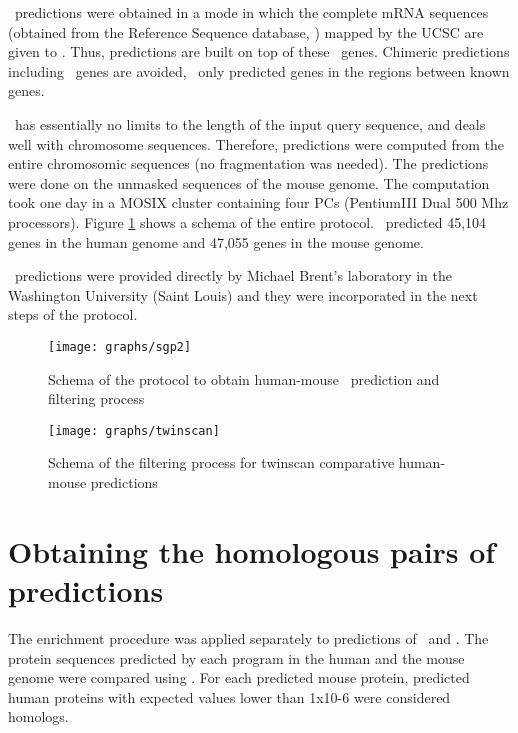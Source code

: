 \sgp\ predictions were obtained in a mode in which the complete mRNA 
sequences (obtained from the Reference Sequence database, )
mapped by the UCSC are given to \sgp. Thus, predictions are built on
top of these \ genes. Chimeric predictions including \
genes are avoided, \sgp\ only predicted genes in the regions between
known genes. 

\sgp\ has essentially no limits to the length of the input query 
sequence, and deals well with chromosome sequences. Therefore,
predictions were computed from the entire chromosomic sequences (no
fragmentation was needed). The predictions were done on the unmasked
sequences of the mouse genome. The computation took one day in a MOSIX
cluster containing four PCs (PentiumIII Dual 500 Mhz processors).
Figure \ref{sgp_graph} shows a schema of the entire protocol. \sgp\
predicted 45,104 genes in the human genome and 47,055 genes in the
mouse genome.

\twinscan\ predictions  were provided directly by Michael Brent's 
laboratory in the Washington University (Saint Louis) and they were
incorporated in the next steps of the protocol.

\begin{figure}
\begin{center}
\texttt{[image: graphs/sgp2]}
\caption{Schema of the protocol to obtain human-mouse \sgp\ prediction 
and filtering process} \label{sgp_graph}
\end{center}
\end{figure}


\begin{figure}
\begin{center}
\texttt{[image: graphs/twinscan]}
\caption{Schema of the filtering process for twinscan comparative 
human-mouse predictions}
\end{center}
\end{figure}

\section{Obtaining the homologous pairs of predictions}

The enrichment procedure was applied separately to predictions of
\twinscan\ and \sgp. The protein sequences predicted by each program in
the human and the mouse genome were compared using \blp. For each
predicted mouse protein, predicted human proteins with expected values
lower than 1x10-6 were considered homologs.

